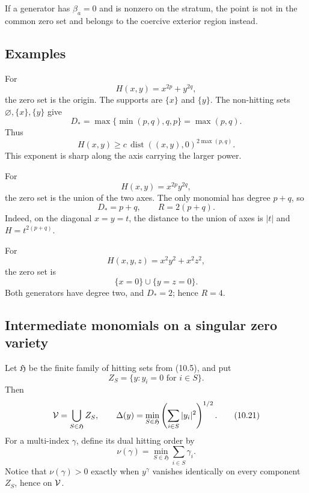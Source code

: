 \documentclass[11pt]{article}
\theoremstyle{remark}
\begin{document}
If a generator has \(\beta_a=0\) and is nonzero on the stratum, the
point is not in the common zero set and belongs to the coercive
exterior region instead.

\subsection{Examples}

\begin{example}
For
\[
 H(x,y)=x^{2p}+y^{2q},                              \tag{10.15}
\]
the zero set is the origin.  The supports are \(\{x\}\) and
\(\{y\}\).  The non-hitting sets
\(\varnothing,\{x\},\{y\}\) give
\[
 D_*=\max\{\min(p,q),q,p\}=\max(p,q).              \tag{10.16}
\]
Thus
\[
 H(x,y)\geq c\,\operatorname{dist}((x,y),0)^{
 2\max(p,q)}.                                      \tag{10.17}
\]
This exponent is sharp along the axis carrying the larger power.
\end{example}

\begin{example}
For
\[
 H(x,y)=x^{2p}y^{2q},                               \tag{10.18}
\]
the zero set is the union of the two axes.  The only monomial has
degree \(p+q\), so
\[
 D_*=p+q,\qquad R=2(p+q).                           \tag{10.19}
\]
Indeed, on the diagonal \(x=y=t\), the distance to the union of axes
is \(|t|\) and \(H=t^{2(p+q)}\).
\end{example}

\begin{example}
For
\[
 H(x,y,z)=x^2y^2+x^2z^2,                            \tag{10.20}
\]
the zero set is
\[
 \{x=0\}\cup\{y=z=0\}.
\]
Both generators have degree two, and \(D_*=2\); hence \(R=4\).
\end{example}

\subsection{Intermediate monomials on a singular zero variety}

Let \({\mathfrak H}\) be the finite family of hitting sets from
(10.5), and put
\[
 Z_S=\{y:y_i=0\text{ for }i\in S\}.
\]
Then
\[
 {\cal V}=\bigcup_{S\in{\mathfrak H}}Z_S,
 \qquad
 \Delta(y)=\min_{S\in{\mathfrak H}}
 \left(\sum_{i\in S}|y_i|^2\right)^{1/2}.          \tag{10.21}
\]
For a multi-index \(\gamma\), define its dual hitting order by
\[
 \nu(\gamma)=
 \min_{S\in{\mathfrak H}}\sum_{i\in S}\gamma_i.  \tag{10.22}
\]
Notice that \(\nu(\gamma)>0\) exactly when \(y^\gamma\) vanishes
identically on every component \(Z_S\), hence on \({\cal V}\).
\end{document}
